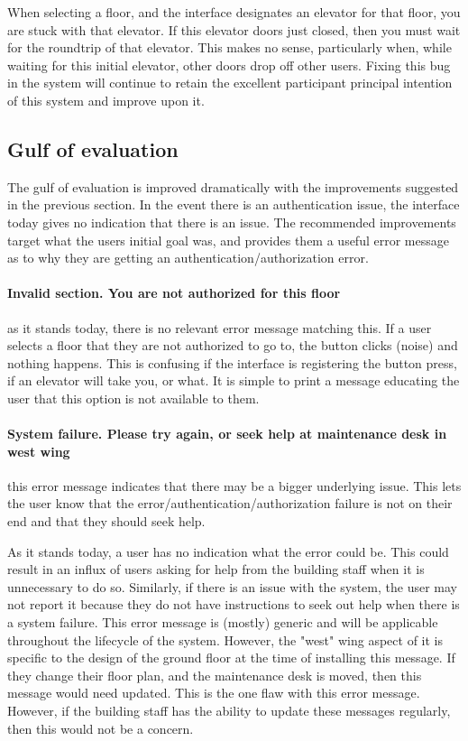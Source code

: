 When selecting a floor, and the interface designates an elevator for that floor, you are stuck with that elevator. If this elevator doors just closed, then you must wait for the roundtrip of that elevator. This makes no sense, particularly when, while waiting for this initial elevator, other doors drop off other users. Fixing this bug in the system will continue to retain the excellent participant principal intention of this system and improve upon it.

\subsection{Gulf of evaluation}
The gulf of evaluation is improved dramatically with the improvements suggested in the previous section. In the event there is an authentication issue, the interface today gives no indication that there is an issue. The recommended improvements target what the users initial goal was, and provides them a useful error message as to why they are getting an authentication/authorization error.

\paragraph{Invalid section. You are not authorized for this floor} as it stands today, there is no relevant error message matching this. If a user selects a floor that they are not authorized to go to, the button clicks (noise) and nothing happens. This is confusing if the interface is registering the button press, if an elevator will take you, or what. It is simple to print a message educating the user that this option is not available to them.

\paragraph{System failure. Please try again, or seek help at maintenance desk in west wing} this error message indicates that there may be a bigger underlying issue. This lets the user know that the error/authentication/authorization failure is not on their end and that they should seek help.

As it stands today, a user has no indication what the error could be. This could result in an influx of users asking for help from the building staff when it is unnecessary to do so. Similarly, if there is an issue with the system, the user may not report it because they do not have instructions to seek out help when there is a system failure. This error message is (mostly) generic and will be applicable throughout the lifecycle of the system. However, the "west" wing aspect of it is specific to the design of the ground floor at the time of installing this message. If they change their floor plan, and the maintenance desk is moved, then this message would need updated. This is the one flaw with this error message. However, if the building staff has the ability to update these messages regularly, then this would not be a concern.

